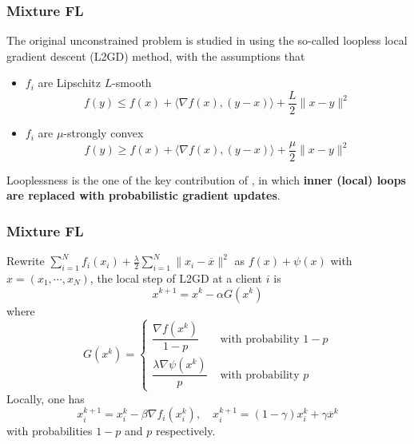 
\begin{frame}
\frametitle{Mixture FL}

The original unconstrained problem is studied in \cite{hanzely2020federated} using the so-called {\color{red} loopless} local gradient descent (L2GD) method, with the assumptions that
\begin{itemize}
    \item $f_i$ are Lipschitz $L$-smooth
    $$f(y) \leqslant f(x) + \langle \nabla f(x), (y-x)\rangle + \dfrac{L}{2} \lVert x-y \rVert^2$$
    \item $f_i$ are $\mu$-strongly convex
    $$f(y) \geqslant f(x) + \langle \nabla f(x), (y-x)\rangle + \dfrac{\mu}{2} \lVert x-y \rVert^2$$
\end{itemize}

{\color{red} Looplessness} is the one of the key contribution of \cite{hanzely2020federated}, in which {\bfseries inner (local) loops are replaced with probabilistic gradient updates}.


\end{frame}


\begin{frame}
\frametitle{Mixture FL}

Rewrite $\sum\limits_{i=1}^N f_i(x_i) + \frac{\lambda}{2} \sum\limits_{i=1}^N \lVert x_i - \overline{x} \rVert^2$ as $f(x) + \psi(x)$ with $x = (x_1,\cdots,x_N)$, the local step of L2GD at a client $i$ is
$$x^{k+1} = x^k - \alpha G(x^k)$$
where
$$
G(x^k) = \begin{cases}
\dfrac{\nabla f(x^k)}{1-p} & \text{ with probability } 1-p \\
\dfrac{\lambda \nabla \psi(x^k)}{p} & \text{ with probability } p 
\end{cases}
$$
Locally, one has
$$x_i^{k+1} = x_i^k - \beta \nabla f_i(x_i^k), \quad x_i^{k+1} = (1-\gamma)x_i^k + \gamma \overline{x}^k$$
with probabilities $1-p$ and $p$ respectively.

\end{frame}


